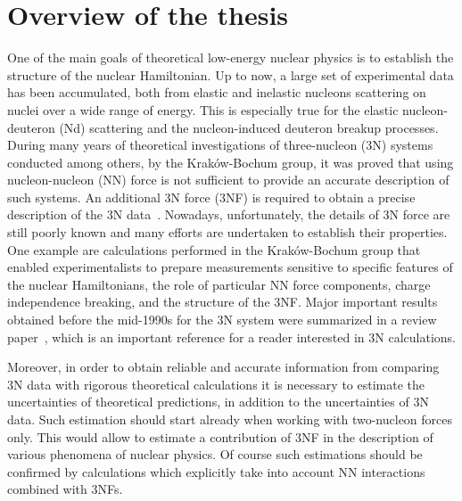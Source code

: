 \chapter*{Overview of the thesis}%
\label{overview}
One of the main goals of theoretical low-energy nuclear physics is to establish 
the structure of the nuclear Hamiltonian. Up to now, a large set of experimental data has 
been accumulated, both from elastic and inelastic nucleons scattering on nuclei 
over a wide range of energy. This is especially true for the elastic nucleon-deuteron 
(Nd) scattering and the nucleon-induced deuteron breakup processes. During many years of theoretical 
investigations of three-nucleon (3N) systems conducted among others, by the 
Krak{\' o}w-Bochum group, it was proved that 
using nucleon-nucleon (NN) force is not sufficient to provide an
accurate description of such systems. An additional 3N force (3NF)
is required to obtain a precise 
description of the 3N data~\cite{Witaa2001}. 
Nowadays, unfortunately, 
the details of 3N force are still poorly known and many efforts are undertaken to establish 
their properties. One example are calculations performed in the 
Krak{\'{o}}w-Bochum group that enabled experimentalists to prepare measurements 
sensitive to specific features of the nuclear Hamiltonians, the role of 
particular NN force components, charge independence breaking, and the structure of 
the 3NF. Major important results obtained before the mid-1990s for the 3N 
system were summarized in a review paper~\cite{Glockle1996}, which is an important 
reference for a reader interested in 3N calculations. 

Moreover, in order to obtain reliable and accurate information from comparing 3N data with rigorous theoretical calculations it is necessary to estimate the uncertainties of theoretical predictions, in addition to the uncertainties of 3N data. Such estimation should start already when working with two-nucleon forces only. This would allow to estimate a contribution of 3NF in the description of various phenomena of nuclear physics. Of course such estimations should be confirmed by calculations which explicitly take into account NN interactions combined with 3NFs. 

